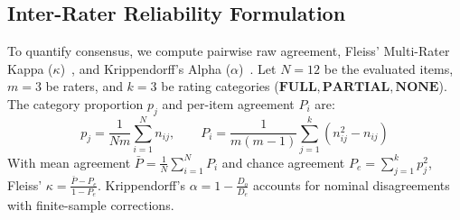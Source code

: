 \subsection{Inter-Rater Reliability Formulation}
\label{sec:expert:reliability}

To quantify consensus, we compute pairwise raw agreement, Fleiss' Multi-Rater Kappa ($\kappa$)~\cite{fleiss_kappa}, and Krippendorff's Alpha ($\alpha$)~\cite{krippendorff_alpha}. Let $N=12$ be the evaluated items, $m=3$ be raters, and $k=3$ be rating categories ($\mathbf{FULL}, \mathbf{PARTIAL}, \mathbf{NONE}$). The category proportion $p_j$ and per-item agreement $P_i$ are:
\begin{equation}
p_j = \frac{1}{Nm} \sum_{i=1}^N n_{ij}, \qquad P_i = \frac{1}{m(m-1)} \sum_{j=1}^k \left( n_{ij}^2 - n_{ij} \right)
\end{equation}
With mean agreement $\bar{P} = \frac{1}{N} \sum_{i=1}^N P_i$ and chance agreement $P_e = \sum_{j=1}^k p_j^2$, Fleiss' $\kappa = \frac{\bar{P} - P_e}{1 - P_e}$. Krippendorff's $\alpha = 1 - \frac{D_o}{D_e}$ accounts for nominal disagreements with finite-sample corrections.

